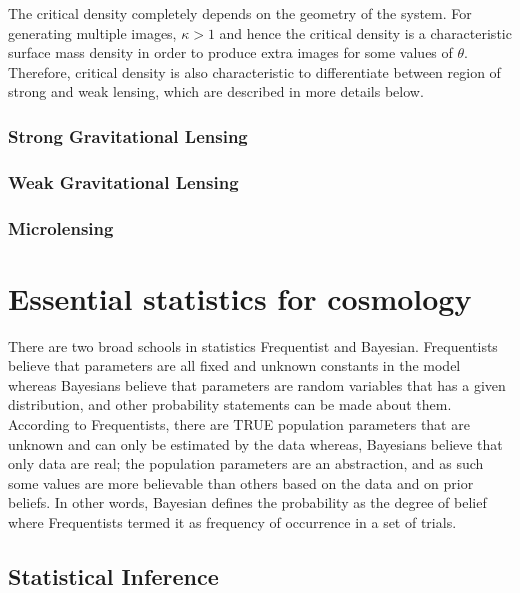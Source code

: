 The critical density completely depends on the geometry of the system. For generating
multiple images, $\kappa>1$ and hence the critical density is a characteristic 
surface mass density in order to produce extra images for some values of $\theta$.
Therefore, critical density is also characteristic to differentiate between region
of strong and weak lensing, which are described in more details below.

\subsubsection{Strong Gravitational Lensing}




\subsubsection{Weak Gravitational Lensing}
\subsubsection{Microlensing}

\clearpage
\section{Essential statistics for cosmology}
There are two broad schools in statistics Frequentist and Bayesian. Frequentists believe
that parameters are all fixed and unknown constants in the model whereas Bayesians
believe that parameters are random variables that has a given distribution, and other probability
statements can be made about them. According to Frequentists, there are TRUE
population parameters that are unknown and can only be estimated by the data whereas,
Bayesians believe that only data are real; the population parameters are an abstraction, and
as such some values are more believable than others based on the data and on prior beliefs.
In other words, Bayesian defines the probability as the degree of belief where Frequentists
termed it as frequency of occurrence in a set of trials. 

\subsection{Statistical Inference}




